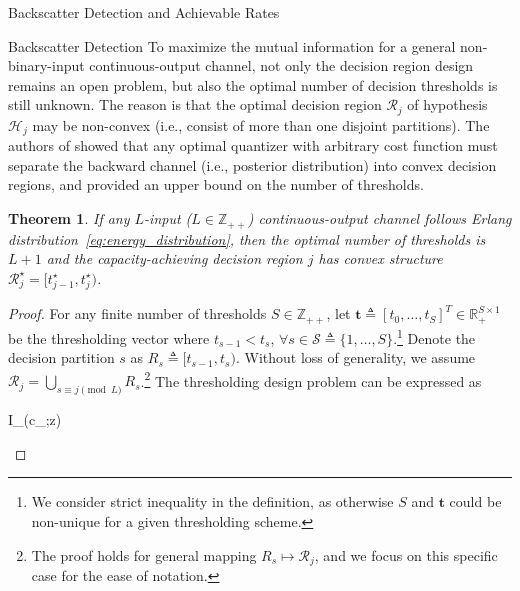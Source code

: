 \documentclass[journal]{IEEEtran}
\newtheorem{theorem}{Theorem}
\begin{document}
\begin{section}{Backscatter Detection and Achievable Rates}
\begin{subsection}{Backscatter Detection}
			To maximize the mutual information for a general non-binary-input continuous-output channel, not only the decision region design remains an open problem, but also the optimal number of decision thresholds is still unknown. The reason is that the optimal decision region $\mathcal{R}_j$ of hypothesis $\mathcal{H}_j$ may be non-convex (i.e., consist of more than one disjoint partitions). The authors of \cite{Nguyen2021} showed that any optimal quantizer with arbitrary cost function must separate the backward channel  (i.e., posterior distribution) into convex decision regions, and provided an upper bound on the number of thresholds.

			\begin{theorem}
				If any $L$-input ($L \in \mathbb{Z}_{++}$) continuous-output channel follows Erlang distribution~\eqref{eq:energy_distribution}, then the optimal number of thresholds is $L+1$ and the capacity-achieving decision region $j$ has convex structure $\mathcal{R}_j^{\star} = [t_{j-1}^{\star}, t_j^{\star})$.
			\end{theorem}

			\begin{proof}
				For any finite number of thresholds $S \in \mathbb{Z}_{++}$, let $\boldsymbol{t} \triangleq [t_0,\ldots,t_S]^T \in \mathbb{R}_{+}^{S \times 1}$ be the thresholding vector where $t_{s-1} < t_s$, $\forall s \in \mathcal{S} \triangleq \{1,\ldots,S\}$.\footnote{We consider strict inequality in the definition, as otherwise $S$ and $\boldsymbol{t}$ could be non-unique for a given thresholding scheme.} Denote the decision partition $s$ as $R_s \triangleq [t_{s-1},t_s)$. Without loss of generality, we assume
				$\mathcal{R}_j = \bigcup_{s \equiv j \pmod L} R_s$.\footnote{The proof holds for general mapping $R_s \mapsto \mathcal{R}_j$, and we focus on this specific case for the ease of notation.} The thresholding design problem can be expressed as
				\begin{maxi!}
					{}{I_{}(c_{};z)}{\label{op:thresholding}}{\label{ob:backscatter_mutual_information}}
				\end{maxi!}


\end{proof}
\end{subsection}
\end{section}
\end{document}
